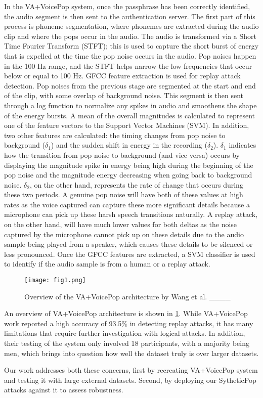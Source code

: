 In the VA+VoicePop system, once the passphrase has been correctly identified, the audio segment is then sent to the authentication server. The first part of this process is phoneme segmentation, where phonemes are extracted during the audio clip and where the pops occur in the audio. The audio is transformed via a Short Time Fourier Transform (STFT); this is used to capture the short burst of energy that is expelled at the time the pop noise occurs in the audio. Pop noises happen in the 100 Hz range, and the STFT helps narrow the low frequencies that occur below or equal to 100 Hz. GFCC feature extraction is used for replay attack detection. Pop noises from the previous stage are segmented at the start and end of the clip, with some overlap of background noise. This segment is then sent through a log function to normalize any spikes in audio and smoothens the shape of the energy bursts. A mean of the overall magnitudes is calculated to represent one of the feature vectors to the Support Vector Machines (SVM). In addition, two other features are calculated: the timing changes from pop noise to background ($\delta_1$) and the sudden shift in energy in the recording ($\delta_2$). $\delta_1$  indicates how the transition from pop noise to background (and vice versa) occurs by displaying the magnitude spike in energy being high during the beginning of the pop noise and the magnitude energy decreasing when going back to background noise. $\delta_2$, on the other hand, represents the rate of change that occurs during these two periods. A genuine pop noise will have both of these values at high rates as the voice captured can capture these more significant details because a microphone can pick up these harsh speech transitions naturally. A replay attack, on the other hand, will have much lower values for both deltas as the noise captured by the microphone cannot pick up on these details due to the audio sample being played from a speaker, which causes these details to be silenced or less pronounced. Once the GFCC features are extracted, a SVM classifier is used to identify if the audio sample is from a human or a replay attack.


\begin{figure}[htbp]
\centerline{\texttt{[image: fig1.png]}}
\caption{Overview of the VA+VoicePop architecture by Wang et al. ____}
\label{fig:1}
\end{figure}



An overview of VA+VoicePop architecture is shown in \ref{fig:1}. While VA+VoicePop work reported a high accuracy of 93.5\% in detecting replay attacks, it has many limitations that require further investigation with logical attacks. In addition, their testing of the system only involved 18 participants, with a majority being men, which brings into question how well the dataset truly is over larger datasets. 

Our work addresses both these concerns, first by recreating VA+VoicePop system and testing it with large external datasets. Second, by deploying our SytheticPop attacks against it to assess robustness.